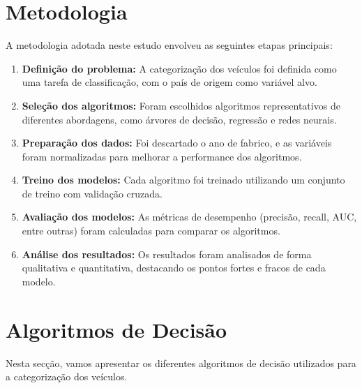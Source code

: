 \documentclass[conference]{IEEEtran}
\begin{document}
\section{Metodologia}
A metodologia adotada neste estudo envolveu as seguintes etapas principais:
\begin{enumerate}
	\item \textbf{Definição do problema:} A categorização dos veículos foi definida como uma tarefa de classificação, com o país de origem como variável alvo.
	\item \textbf{Seleção dos algoritmos:} Foram escolhidos algoritmos representativos de diferentes abordagens, como árvores de decisão, regressão e redes neurais.
	\item \textbf{Preparação dos dados:} Foi descartado o ano de fabrico, e as variáveis foram normalizadas para melhorar a performance dos algoritmos.
	\item \textbf{Treino dos modelos:} Cada algoritmo foi treinado utilizando um conjunto de treino com validação cruzada.
	\item \textbf{Avaliação dos modelos:} As métricas de desempenho (precisão, recall, AUC, entre outras) foram calculadas para comparar os algoritmos.
	\item \textbf{Análise dos resultados:} Os resultados foram analisados de forma qualitativa e quantitativa, destacando os pontos fortes e fracos de cada modelo.
\end{enumerate}

\section{Algoritmos de Decisão}
Nesta secção, vamos apresentar os diferentes algoritmos de decisão utilizados para a categorização dos veículos.
\end{document}
